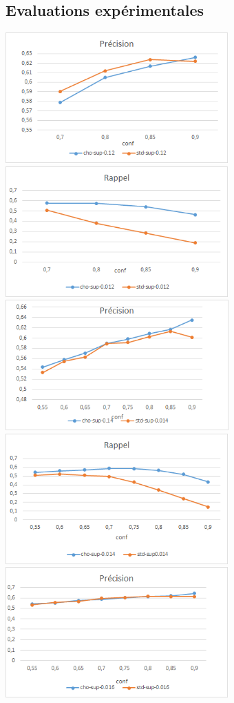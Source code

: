 \documentclass[a4paper,12pt,openany,oneside]{article}
\begin{document}
\subsection{Evaluations expérimentales}
\medskip
\noindent \includegraphics[height=5cm]{s0-012.png}
\includegraphics[height=5cm]{s0-012r.png}
\bigskip
\includegraphics[height=5cm]{s0-014.png}
\includegraphics[height=5cm]{s0-014r.png}
\medskip
\includegraphics[height=5cm]{s0-016.png}
\end{document}
